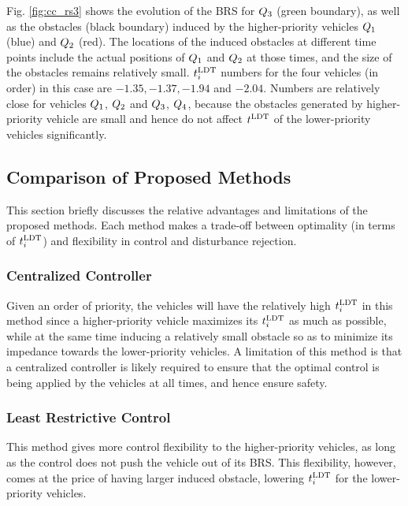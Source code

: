 Fig. \ref{fig:cc_rs3} shows the evolution of the BRS for $Q_{3}$ (green boundary), as well as the obstacles (black boundary) induced by the higher-priority vehicles $Q_{1}$ (blue) and $Q_{2}$ (red). The locations of the induced obstacles at different time points include the actual positions of $Q_{1}$ and $Q_{2}$ at those times, and the size of the obstacles remains relatively small. $t^\text{LDT}_i$ numbers for the four vehicles (in order) in this case are $-1.35, -1.37, -1.94$ and $-2.04$. Numbers are relatively close for vehicles $Q_{1}$, $Q_{2}$ and $Q_{3}$, $Q_{4}$, because the obstacles generated by higher-priority vehicle are small and hence do not affect $t^\text{LDT}$ of the lower-priority vehicles significantly. 

\subsection{Comparison of Proposed Methods}
This section briefly discusses the relative advantages and limitations of the proposed methods. Each method makes a trade-off between optimality (in terms of $t^\text{LDT}_i$) and flexibility in control and disturbance rejection.

\subsubsection{Centralized Controller}
Given an order of priority, the vehicles will have the relatively high $t^\text{LDT}_i$ in this method since a higher-priority vehicle maximizes its $t^\text{LDT}_i$ as much as possible, while at the same time inducing a relatively small obstacle so as to minimize its impedance towards the lower-priority vehicles. A limitation of this method is that a centralized controller is likely required to ensure that the optimal control is being applied by the vehicles at all times, and hence ensure safety.

\subsubsection{Least Restrictive Control}
This method gives more control flexibility to the higher-priority vehicles, as long as the control does not push the vehicle out of its BRS. This flexibility, however, comes at the price of having larger induced obstacle, lowering $t^\text{LDT}_i$ for the lower-priority vehicles.  

